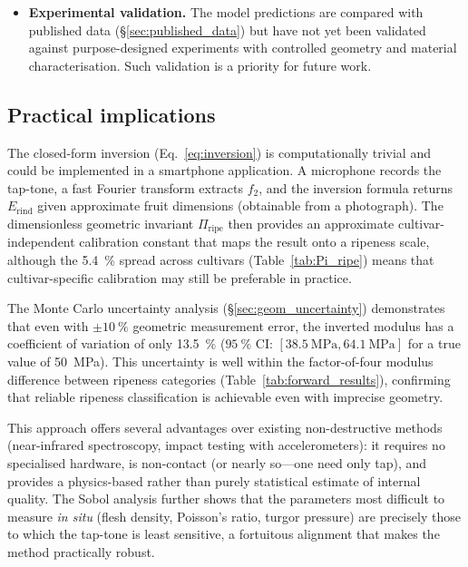 \begin{itemize}
  \item \textbf{Experimental validation.}  The model predictions are
    compared with published data (\S\ref{sec:published_data}) but have
    not yet been validated against purpose-designed experiments with
    controlled geometry and material characterisation.  Such validation
    is a priority for future work.
\end{itemize}

\subsection{Practical implications}
\label{sec:practical}

The closed-form inversion (Eq.~\ref{eq:inversion}) is computationally
trivial and could be implemented in a smartphone application.  A
microphone records the tap-tone, a fast Fourier transform extracts
$f_2$, and the inversion formula returns $E_{\mathrm{rind}}$ given
approximate fruit dimensions (obtainable from a photograph).  The
dimensionless geometric invariant $\Pi_{\mathrm{ripe}}$ then provides
an approximate cultivar-independent calibration constant that maps the
result onto a ripeness scale, although the \SI{5.4}{\percent} spread
across cultivars (Table~\ref{tab:Pi_ripe}) means that cultivar-specific
calibration may still be preferable in practice.

The Monte Carlo uncertainty analysis (\S\ref{sec:geom_uncertainty})
demonstrates that even with $\pm\SI{10}{\percent}$ geometric
measurement error, the inverted modulus has a coefficient of variation
of only \SI{13.5}{\percent} ($\SI{95}{\percent}$ CI:
$[\SI{38.5}{\mega\pascal}, \SI{64.1}{\mega\pascal}]$ for a true value
of \SI{50}{\mega\pascal}).  This uncertainty is well within the
factor-of-four modulus difference between ripeness categories
(Table~\ref{tab:forward_results}), confirming that reliable ripeness
classification is achievable even with imprecise geometry.

This approach offers several advantages over existing non-destructive
methods (near-infrared spectroscopy, impact testing with accelerometers):
it requires no specialised hardware, is non-contact (or nearly so---one
need only tap), and provides a physics-based rather than purely
statistical estimate of internal quality.  The Sobol analysis further
shows that the parameters most difficult to measure \emph{in situ}
(flesh density, Poisson's ratio, turgor pressure) are precisely those
to which the tap-tone is least sensitive, a fortuitous alignment that
makes the method practically robust.

